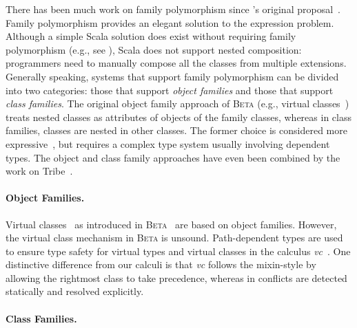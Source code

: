 There has been much work on family polymorphism since \citeauthor{Ernst_2001}'s
original proposal~\citep{Ernst_2001}. Family polymorphism provides an elegant
solution to the expression problem. Although a simple Scala solution does exist
without requiring family polymorphism (e.g., see \citet{wang2016expression}), Scala does not support nested composition:
programmers need to manually compose all the classes from multiple extensions.
Generally speaking, systems that support family polymorphism can be divided into
two categories: those that support \emph{object families} and those that
support \emph{class families}. The original object family approach of
\textsc{Beta }(e.g., virtual classes~\citep{Madsen_1989}) treats nested classes as
attributes of objects of the family classes, whereas in class families,
classes are nested in other classes. The former choice is considered more
expressive~\citep{ErnstVirtual}, but requires a complex type system usually
involving dependent types. The object and class family approaches have even been
combined by the work on Tribe~\citep{pubsdoc:tribe-virtual-calculus}.

\paragraph{Object Families.}

Virtual classes~\citep{Madsen_1989} as introduced in
\textsc{Beta}~\citep{LehrmannMadsen:1993:OPB:221048} are based on object
families. However, the virtual class mechanism in \textsc{Beta} is unsound.
Path-dependent types are used to ensure type safety for virtual types and
virtual classes in the calculus \emph{vc}~\citep{ErnstVirtual}. One distinctive
difference from our calculi is that \emph{vc} follows the mixin-style by
allowing the rightmost class to take precedence, whereas in \namee conflicts are
detected statically and resolved explicitly.

\paragraph{Class Families.}

